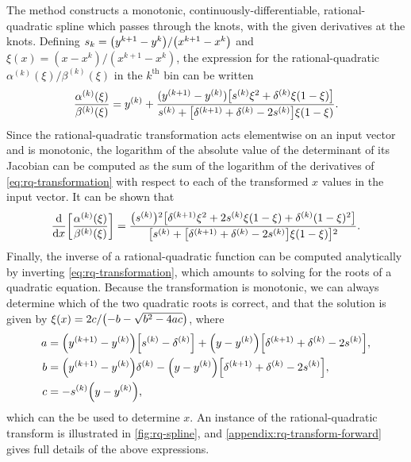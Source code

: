 The method constructs a monotonic, continuously-differentiable, rational-quadratic spline which passes through the knots, with the given derivatives at the knots. 
Defining $ s_{k} = \mathopen{}\left(y^{k+1} - y^{k}\right)\mathclose{}/\mathopen{}\left(x^{k+1} - x^{k}\right)\mathclose{} $ and $ \xi(x) = (x - x^{k}) / (x^{k+1} - x^{k}) $, the expression for the rational-quadratic $ \alpha^{(k)}(\xi) / \beta^{(k)}(\xi) $ in the $ k^{\text{th}} $ bin can be written
\begin{align}
    \frac{\alpha^{(k)}(\xi)}{\beta^{(k)}(\xi)} = y^{(k)} + \frac{(y^{(k + 1)} - y^{(k)}) \mathopen{}\left[s^{(k)} \xi^{2} + \delta^{(k)} \xi (1 - \xi)\right]\mathclose{}}{s^{(k)} + \mathopen{}\left[\delta^{(k + 1)} + \delta^{(k)} - 2 s^{(k)}\right]\mathclose{} \xi (1 - \xi)}.
    \label{eq:rq-transformation}
\end{align}
Since the rational-quadratic transformation acts elementwise on an input vector and is monotonic, the logarithm of the absolute value of the determinant of its Jacobian can be computed as the sum of the logarithm of the derivatives of \cref{eq:rq-transformation} with respect to each of the transformed $ x $ values in the input vector. 
It can be shown that
\begin{align}
	\frac{\mathop{}\!\mathrm{d}}{\mathop{}\!\mathrm{d} x} \mathopen{}\left[ \frac{\alpha^{(k)}(\xi)}{\beta^{(k)}(\xi)} \right]\mathclose{} =  \frac{\mathopen{}\left(s^{(k)}\right)\mathclose{}^{2} \mathopen{}\left[ \delta^{(k + 1)} \xi^{2} + 2 s^{(k)} \xi (1 - \xi) + \delta^{(k)} (1 - \xi)^{2} \right]\mathclose{}}{\mathopen{}\left[s^{(k)} + \mathopen{}\left[\delta^{(k + 1)} + \delta^{(k)} - 2 s^{(k)}\right]\mathclose{} \xi (1 - \xi)\right]\mathclose{}^{2}}.
	\label{eq:rq-derivative}
\end{align}
Finally, the inverse of a rational-quadratic function can be computed analytically by inverting \cref{eq:rq-transformation}, which amounts to solving for the roots of a quadratic equation.
Because the transformation is monotonic, we can always determine which of the two quadratic roots is correct, and that the solution is given by $ \xi(x) = 2c / \mathopen{}\left(- b - \sqrt{ b^{2} - 4 a c}\right)\mathclose{} $, where
\begin{align}
    a &=  \mathopen{}\left(y^{(k + 1)} - y^{(k)}\right)\mathclose{} \mathopen{}\left[s^{(k)} - \delta^{(k)}\right]\mathclose{} + \mathopen{}\left( y - y^{(k)} \right)\mathclose{} \mathopen{}\left[\delta^{(k + 1)} + \delta^{(k)} - 2 s^{(k)}\right]\mathclose{},\\
	b &= \mathopen{}\left(y^{(k + 1)} - y^{(k)}\right)\mathclose{} \delta^{(k)} -  \mathopen{}\left( y - y^{(k)} \right)\mathclose{} \mathopen{}\left[\delta^{(k + 1)} + \delta^{(k)} - 2 s^{(k)}\right]\mathclose{},\\
	c &= - s^{(k)} \mathopen{}\left( y - y^{(k)} \right)\mathclose{},
\end{align}
which can the be used to determine $ x $.
An instance of the rational-quadratic transform is illustrated in \cref{fig:rq-spline}, and
\cref{appendix:rq-transform-forward} gives full details of the above expressions.

